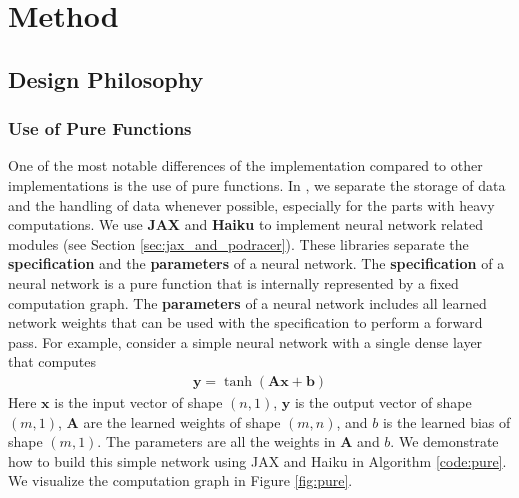 \chapter{Method} \label{sec:method}

\section{Design Philosophy}

\subsection{Use of Pure Functions}
One of the most notable differences of the \moozi implementation compared to other implementations is the use of pure functions.
In \moozi, we separate the storage of data and the handling of data whenever possible, especially for the parts with heavy computations.
We use \textbf{JAX} and \textbf{Haiku} \cite{HaikuSonnetJAX_Hennigan.Cai.ea_2020,JAXComposableTransformations_JamesBradbury.RoyFrostig.ea_2018} to implement neural network related modules (see Section \ref{sec:jax_and_podracer}).
These libraries separate the \textbf{specification} and the \textbf{parameters} of a neural network.
The \textbf{specification} of a neural network is a pure function that is internally represented by a fixed computation graph.
The \textbf{parameters} of a neural network includes all learned network weights that can be used with the specification to perform a forward pass.
For example, consider a simple neural network with a single dense layer that computes
\begin{align*}
    \mathbf{y} = \operatorname{tanh}\left( \mathbf{A}\mathbf{x} + \mathbf{b} \right)
\end{align*}
Here $\mathbf{x}$ is the input vector of shape $(n, 1)$, $\mathbf{y}$ is the output vector of shape $(m, 1)$, $\mathbf{A}$ are the learned weights of shape $(m, n)$, and $b$ is the learned bias of shape $(m, 1)$.
The parameters are all the weights in $\mathbf{A}$ and $b$.
We demonstrate how to build this simple network using JAX and Haiku in Algorithm \ref{code:pure}.
We visualize the computation graph in Figure \ref{fig:pure}.

